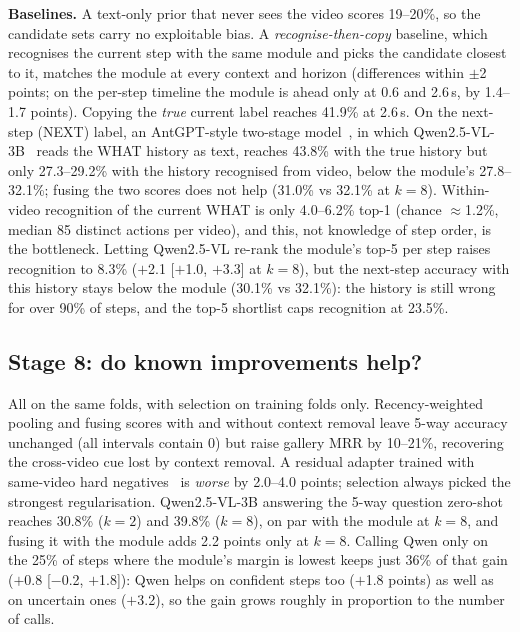 \documentclass[conference,a4paper]{IEEEtran}
\begin{document}
\textbf{Baselines.} A text-only prior that never sees the video scores 19--20\%, so the candidate sets carry no exploitable bias. A \emph{recognise-then-copy} baseline, which recognises the current step with the same module and picks the candidate closest to it, matches the module at every context and horizon (differences within $\pm$2 points; on the per-step timeline the module is ahead only at 0.6 and 2.6\,s, by 1.4--1.7 points). Copying the \emph{true} current label reaches 41.9\% at 2.6\,s. On the next-step (NEXT) label, an AntGPT-style two-stage model~\cite{zhao2024antgpt}, in which Qwen2.5-VL-3B~\cite{bai2025qwen25vl} reads the WHAT history as text, reaches 43.8\% with the true history but only 27.3--29.2\% with the history recognised from video, below the module's 27.8--32.1\%; fusing the two scores does not help (31.0\% vs 32.1\% at $k=8$). Within-video recognition of the current WHAT is only 4.0--6.2\% top-1 (chance $\approx$1.2\%, median 85 distinct actions per video), and this, not knowledge of step order, is the bottleneck. Letting Qwen2.5-VL re-rank the module's top-5 per step raises recognition to 8.3\% ($+$2.1 [$+$1.0, $+$3.3] at $k=8$), but the next-step accuracy with this history stays below the module (30.1\% vs 32.1\%): the history is still wrong for over 90\% of steps, and the top-5 shortlist caps recognition at 23.5\%.

\subsection{Stage 8: do known improvements help?}
All on the same folds, with selection on training folds only. Recency-weighted pooling and fusing scores with and without context removal leave 5-way accuracy unchanged (all intervals contain 0) but raise gallery MRR by 10--21\%, recovering the cross-video cue lost by context removal. A residual adapter trained with same-video hard negatives~\cite{robinson2021hard} is \emph{worse} by 2.0--4.0 points; selection always picked the strongest regularisation. Qwen2.5-VL-3B answering the 5-way question zero-shot reaches 30.8\% ($k=2$) and 39.8\% ($k=8$), on par with the module at $k=8$, and fusing it with the module adds 2.2 points only at $k=8$. Calling Qwen only on the 25\% of steps where the module's margin is lowest keeps just 36\% of that gain ($+$0.8 [$-$0.2, $+$1.8]): Qwen helps on confident steps too ($+$1.8 points) as well as on uncertain ones ($+$3.2), so the gain grows roughly in proportion to the number of calls.

\end{document}

